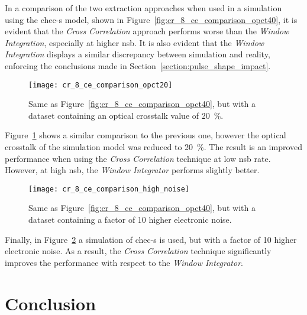 In a comparison of the two extraction approaches when used in a simulation using the \gls{chec-s} model, shown in Figure~\ref{fig:cr_8_ce_comparison_opct40}, it is evident that the \textit{Cross Correlation} approach performs worse than the \textit{Window Integration}, especially at higher \gls{nsb}. It is also evident that the \textit{Window Integration} displays a similar discrepancy between simulation and reality, enforcing the conclusions made in Section~\ref{section:pulse_shape_impact}.  

\begin{figure}
  \texttt{[image: cr\_8\_ce\_comparison\_opct20]}
  \caption[\textit{Charge Resolution} comparison between \textit{Cross Correlation} and \textit{Window Integration} for \textit{MCLab} data with an optical crosstalk of \SI{20}{\percent}.]{Same as Figure~\ref{fig:cr_8_ce_comparison_opct40}, but with a dataset containing an optical crosstalk value of \SI{20}{\percent}.}
  \label{fig:cr_8_ce_comparison_opct20}
\end{figure}

Figure~\ref{fig:cr_8_ce_comparison_opct20} shows a similar comparison to the previous one, however the optical crosstalk of the simulation model was reduced to \SI{20}{\percent}. The result is an improved performance when using the \textit{Cross Correlation} technique at low \gls{nsb} rate. However, at high \gls{nsb}, the \textit{Window Integrator} performs slightly better.

\begin{figure}
  \texttt{[image: cr\_8\_ce\_comparison\_high\_noise]}
  \caption[\textit{Charge Resolution} comparison between \textit{Cross Correlation} and \textit{Window Integration} for \textit{MCLab} data with a high amount of electronic noise.]{Same as Figure~\ref{fig:cr_8_ce_comparison_opct40}, but with a dataset containing a factor of 10 higher electronic noise.}
  \label{fig:cr_8_ce_comparison_high_noise}
\end{figure}

Finally, in Figure~\ref{fig:cr_8_ce_comparison_high_noise} a simulation of \gls{chec-s} is used, but with a factor of 10 higher electronic noise. As a result, the \textit{Cross Correlation} technique significantly improves the performance with respect to the \textit{Window Integrator}.

\section{Conclusion}

